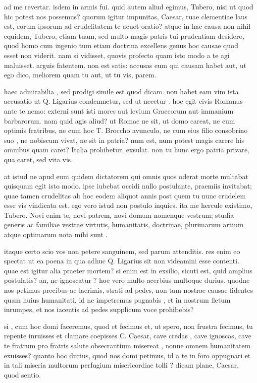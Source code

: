  ad me revertar. isdem in armis fui. quid autem aliud egimus, Tubero, nisi ut quod hic potest nos possemus? quorum igitur impunitas, Caesar, tuae clementiae laus est, eorum ipsorum ad crudelitatem te acuet oratio? atque in hac causa non nihil equidem, Tubero, etiam tuam, sed multo magis patris tui prudentiam desidero, quod homo cum ingenio tum etiam doctrina excellens genus hoc causae quod esset non viderit. nam si vidisset, quovis profecto quam isto modo a te agi maluisset. arguis fatentem. non est satis: accusas eum qui causam habet aut, ut ego dico, meliorem quam tu aut, ut tu vis, parem.

 haec admirabilia , sed prodigi simile est quod dicam. non habet eam vim ista accusatio ut Q. Ligarius condemnetur, sed ut necetur . hoc egit civis Romanus ante te nemo: externi sunt isti mores aut levium Graecorum aut immanium barbarorum. nam quid agis aliud? ut Romae ne sit, ut domo careat, ne cum optimis fratribus, ne cum hoc T. Broccho avunculo, ne cum eius filio consobrino suo , ne nobiscum vivat, ne sit in patria? num est, num potest magis carere his omnibus quam caret? Italia prohibetur, exsulat. non tu hunc ergo patria privare, qua caret, sed vita vis.

 at istud ne apud eum quidem dictatorem qui omnis quos oderat morte multabat quisquam egit isto modo. ipse iubebat occidi nullo postulante, praemiis invitabat; quae tamen crudelitas ab hoc eodem aliquot annis post quem tu nunc crudelem esse vis vindicata est. ego vero istud non postulo inquies. ita me hercule existimo, Tubero. Novi enim te, novi patrem, novi domum nomenque vestrum; studia generis ac familiae vestrae virtutis, humanitatis, doctrinae, plurimarum artium atque optimarum nota mihi sunt .

 itaque certo scio vos non petere sanguinem, sed parum attenditis. res enim eo spectat ut ea poena in qua adhuc Q. Ligarius sit non videamini esse contenti. quae est igitur alia praeter mortem? si enim est in exsilio, sicuti est, quid amplius postulatis? an, ne ignoscatur ? hoc vero multo acerbius multoque durius. quodne nos petimus precibus ac lacrimis, strati ad pedes, non tam nostrae causae fidentes quam huius humanitati, id ne impetremus pugnabis , et in nostrum fletum inrumpes, et nos iacentis ad pedes supplicum voce prohibebis?

 si , cum hoc domi faceremus, quod et fecimus et, ut spero, non frustra fecimus, tu repente inruisses et clamare coepisses C. Caesar, cave credas , cave ignoscas, cave te fratrum pro fratris salute obsecrantium misereat , nonne omnem humanitatem exuisses? quanto hoc durius, quod nos domi petimus, id a te in foro oppugnari et in tali miseria multorum perfugium misericordiae tolli ? dicam plane, Caesar, quod sentio.

